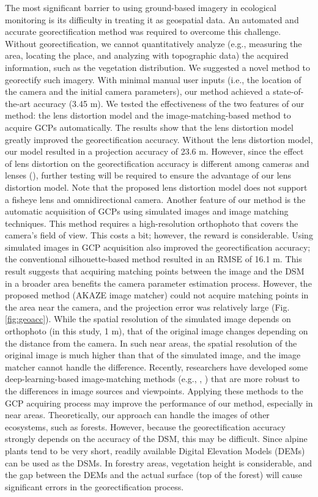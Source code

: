 \documentclass{article}
\begin{document}
The most significant barrier to using ground-based imagery in ecological monitoring is its difficulty in treating it as geospatial data. An automated and accurate georectification method was required to overcome this challenge. Without georectification, we cannot quantitatively analyze (e.g., measuring the area, locating the place, and analyzing with topographic data) the acquired information, such as the vegetation distribution. We suggested a novel method to georectify such imagery. With minimal manual user inputs (i.e., the location of the camera and the initial camera parameters), our method achieved a state-of-the-art accuracy (3.45 m). We tested the effectiveness of the two features of our method: the lens distortion model and the image-matching-based method to acquire GCPs automatically. The results show that the lens distortion model greatly improved the georectification accuracy. Without the lens distortion model, our model resulted in a projection accuracy of 23.6 m. However, since the effect of lens distortion on the georectification accuracy is different among cameras and lenses (\cite{Portenier2020Cryosphere}), further testing will be required to ensure the advantage of our lens distortion model. Note that the proposed lens distortion model does not support a fisheye lens and omnidirectional camera. Another feature of our method is the automatic acquisition of GCPs using simulated images and image matching techniques. This method requires a high-resolution orthophoto that covers the camera's field of view. This costs a bit; however, the reward is considerable. Using simulated images in GCP acquisition also improved the georectification accuracy; the conventional silhouette-based method resulted in an RMSE of 16.1 m. This result suggests that acquiring matching points between the image and the DSM in a broader area benefits the camera parameter estimation process. However, the proposed method (AKAZE image matcher) could not acquire matching points in the area near the camera, and the projection error was relatively large (Fig. \ref{fig:geoacc}). While the spatial resolution of the simulated image depends on orthophoto (in this study, 1 m), that of the original image changes depending on the distance from the camera. In such near areas, the spatial resolution of the original image is much higher than that of the simulated image, and the image matcher cannot handle the difference. Recently, researchers have developed some deep-learning-based image-matching methods (e.g., \cite{Yang2018ImageMatching}, \cite{Wu2013AEImageMatching}) that are more robust to the differences in image sources and viewpoints. Applying these methods to the GCP acquiring process may improve the performance of our method, especially in near areas. Theoretically, our approach can handle the images of other ecosystems, such as forests. However, because the georectification accuracy strongly depends on the accuracy of the DSM, this may be difficult. Since alpine plants tend to be very short, readily available Digital Elevation Models (DEMs) can be used as the DSMs. In forestry areas, vegetation height is considerable, and the gap between the DEMs and the actual surface (top of the forest) will cause significant errors in the georectification process.
\end{document}
